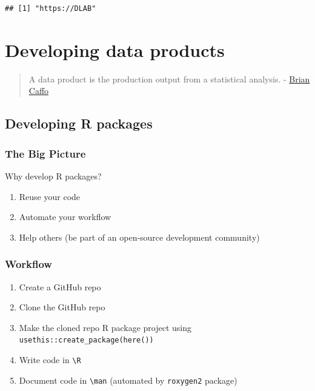 \documentclass[
]{book}
\providecommand{\tightlist}{%
  \setlength{\itemsep}{0pt}\setlength{\parskip}{0pt}}
\begin{document}
\begin{verbatim}
## [1] "https://DLAB"
\end{verbatim}

\chapter{Developing data products}\label{products}

\begin{quote}
A data product is the production output from a statistical analysis. - \href{https://sites.google.com/view/bcaffo/home}{Brian Caffo}
\end{quote}

\section{Developing R packages}\label{developing-r-packages}

\subsection{The Big Picture}\label{the-big-picture-7}

Why develop R packages?

\begin{enumerate}
\def\labelenumi{\arabic{enumi}.}
\tightlist
\item
  Reuse your code
\item
  Automate your workflow
\item
  Help others (be part of an open-source development community)
\end{enumerate}

\subsection{Workflow}\label{workflow}

\begin{enumerate}
\def\labelenumi{\arabic{enumi}.}
\tightlist
\item
  Create a GitHub repo
\item
  Clone the GitHub repo
\item
  Make the cloned repo R package project using \texttt{usethis::create\_package(here())}
\item
  Write code in \texttt{\textbackslash{}R}
\item
  Document code in \texttt{\textbackslash{}man} (automated by \texttt{roxygen2} package)
\end{enumerate}
\end{document}
